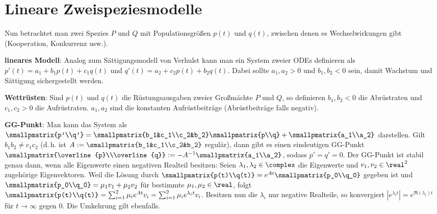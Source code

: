 \pagebreak

\section{%
    Lineare Zweispeziesmodelle%
}

Nun betrachtet man zwei Spezies $P$ und $Q$ mit Populationsgrößen $p(t)$ und $q(t)$,
zwischen denen es Wechselwirkungen gibt (Kooperation, Konkurrenz usw.).

\textbf{lineares Modell}:
Analog zum Sättigungsmodell von Verhulst kann man ein System zweier ODEs definieren als
$p'(t) = a_1 + b_1 p(t) + c_1 q(t)$ und $q'(t) = a_2 + c_2 p(t) + b_2 q(t)$.
Dabei sollte $a_1, a_2 > 0$ und $b_1, b_2 < 0$ sein, damit Wachstum und Sättigung sichergestellt
werden.

\linie

\textbf{Wettrüsten}:
Sind $p(t)$ und $q(t)$ die Rüstungsausgaben zweier Großmächte $P$ und $Q$, so definieren
$b_1, b_2 < 0$ die Abrüstraten und $c_1, c_2 > 0$ die Aufrüstraten.
$a_1, a_2$ sind die konstanten Aufrüstbeiträge (Abrüstbeiträge falls negativ).

\textbf{GG-Punkt}:
Man kann das System als
$\smallpmatrix{p'\\q'} = \smallpmatrix{b_1&c_1\\c_2&b_2} \smallpmatrix{p\\q} +
\smallpmatrix{a_1\\a_2}$
darstellen.
Gilt $b_1 b_2 \not= c_1 c_2$ (d.\,h. ist $A := \smallpmatrix{b_1&c_1\\c_2&b_2}$ regulär),
dann gibt es einen eindeutigen GG-Punkt
$\smallpmatrix{\overline{p}\\\overline{q}} := -A^{-1} \smallpmatrix{a_1\\a_2}$,
sodass $p' = q' = 0$.
Der GG-Punkt ist stabil genau dann, wenn alle Eigenwerte einen negativen Realteil besitzen:
Seien $\lambda_1, \lambda_2 \in \complex$ die Eigenwerte und $v_1, v_2 \in \real^2$
zugehörige Eigenvektoren.
Weil die Lösung durch $\smallpmatrix{p(t)\\q(t)} = e^{At} \smallpmatrix{p_0\\q_0}$ gegeben ist
und $\smallpmatrix{p_0\\q_0} = \mu_1 v_1 + \mu_2 v_2$ für bestimmte $\mu_1, \mu_2 \in \real$,
folgt $\smallpmatrix{p(t)\\q(t)} = \sum_{i=1}^2 \mu_i e^{At} v_i
= \sum_{i=1}^2 \mu_i e^{\lambda_i t} v_i$.
Besitzen nun die $\lambda_i$ nur negative Realteile, so konvergiert
$|e^{\lambda_i t}| = e^{\Re(\lambda_i)t}$ für $t \to \infty$ gegen $0$.
Die Umkehrung gilt ebenfalls.

